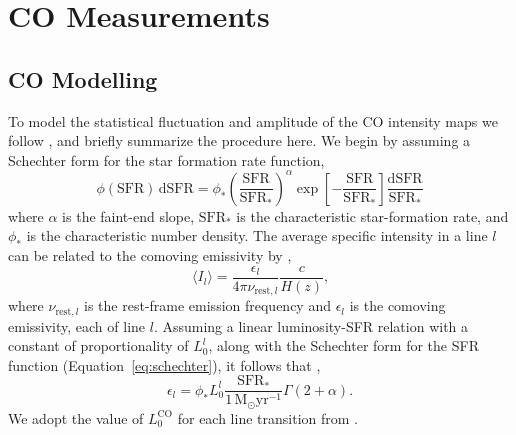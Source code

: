 \documentclass{aastex62}
\newcommand{\Msun}{\ensuremath{\text{M}_\odot}}
\newcommand{\SFR}{\ensuremath{\text{SFR}}}
\newcommand{\CO}{\ensuremath{\text{CO}}}
\newcommand{\beq}{\begin{equation}}
\newcommand{\eeq}{\end{equation}}
\newcommand{\avg}[1]{\ensuremath{\langle #1 \rangle}}
\begin{document}
\section{CO Measurements} \label{sec:co_measurements}
\subsection{CO Modelling} \label{ssec:co_modelling}
To model the statistical fluctuation and amplitude of the \CO{} intensity maps
we follow \citet{2016ApJ...825..143L}, and briefly summarize the procedure
here. We begin by assuming a Schechter form for the star formation rate
function,
\beq\label{eq:schechter}
\phi(\SFR)\,\text{d}\SFR = \phi_*
\left(\frac{\SFR}{\SFR_*}\right)^{\alpha}\exp{\left[-\frac{\SFR}{\SFR_*}\right]}
\frac{\text{d}\SFR}{\SFR_*}
\eeq
where $\alpha$ is the faint-end slope, $\SFR_*$ is the characteristic
star-formation rate, and $\phi_*$ is the characteristic number density. The
average specific intensity in a line $l$ can be related to the comoving
emissivity by \citep{2011ApJ...741...70L, 2013ApJ...768...15P},
\beq\label{eq:emiss_to_int}
\avg{I_l} = \frac{\epsilon_l}{4\pi \nu_{\text{rest},l}}\frac{c}{H(z)}\text{,}
\eeq
where $\nu_{\text{rest},l}$ is the rest-frame emission frequency and
$\epsilon_l$ is the comoving emissivity, each of line $l$. Assuming a linear
luminosity-SFR relation with a constant of proportionality of $L_0^l$, along
with the Schechter form for the SFR function (Equation~\ref{eq:schechter}), it
follows that \citep{2013ApJ...768...15P},
\beq\label{eq:com_emiss}
\epsilon_l = \phi_* L_0^{l}
\frac{\SFR_*}{1\,\Msun\text{yr}^{-1}}\Gamma{(2+\alpha)}\text{.}
\eeq
We adopt the value of $L_0^{\CO}$ for each line transition from
\citet{2010JCAP...11..016V}.



\end{document}
